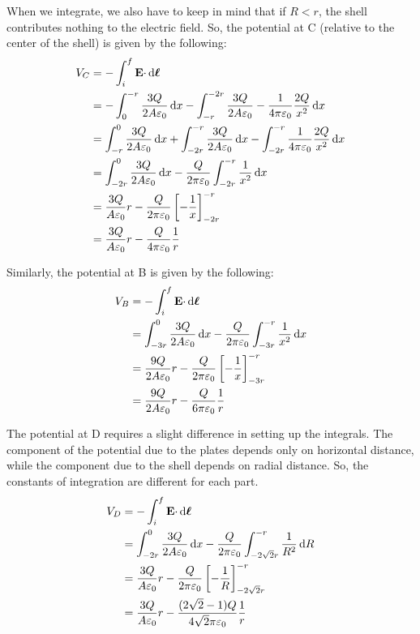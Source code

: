 \documentclass{article}
\begin{document}
When we integrate, we also have to keep in mind that if $R < r$, the shell contributes nothing to the electric field. So, the potential at C (relative to the center of the shell) is given by the following:
\begin{equation*}
\begin{aligned}
V_C &= -\int_i^f \vb{E}\cdotp \dd{\vb*{\ell}} \\
&= -\int_0^{-r} \frac{3Q}{2A\varepsilon_0}\dd{x} - \int_{-r}^{-2r} \frac{3Q}{2A\varepsilon_0} - \frac{1}{4 \pi\varepsilon_0}\frac{2Q}{x^2}\dd{x} \\
&= \int_{-r}^0 \frac{3Q}{2A\varepsilon_0}\dd{x} + \int_{-2r}^{-r} \frac{3Q}{2A\varepsilon_0}\dd{x} - \int_{-2r}^{-r} \frac{1}{4 \pi\varepsilon_0}\frac{2Q}{x^2}\dd{x} \\
&= \int_{-2r}^0 \frac{3Q}{2A\varepsilon_0}\dd{x} - \frac{Q}{2 \pi\varepsilon_0}\int_{-2r}^{-r} \frac{1}{x^2}\dd{x} \\
&= \frac{3Q}{A\varepsilon_0}r - \frac{Q}{2 \pi\varepsilon_0}\left[-\frac{1}{x}\right]_{-2r}^{-r} \\
&= \frac{3Q}{A\varepsilon_0}r - \frac{Q}{4 \pi\varepsilon_0}\frac{1}{r}
\end{aligned}
\end{equation*}

Similarly, the potential at B is given by the following:
\begin{equation*}
\begin{aligned}
V_B &= -\int_i^f \vb{E}\cdotp \dd{\vb*{\ell}} \\
&= \int_{-3r}^0 \frac{3Q}{2A\varepsilon_0}\dd{x} - \frac{Q}{2 \pi\varepsilon_0}\int_{-3r}^{-r} \frac{1}{x^2}\dd{x} \\
&= \frac{9Q}{2A\varepsilon_0}r - \frac{Q}{2 \pi\varepsilon_0}\left[-\frac{1}{x}\right]_{-3r}^{-r} \\
&= \frac{9Q}{2A\varepsilon_0}r - \frac{Q}{6 \pi\varepsilon_0}\frac{1}{r}
\end{aligned}
\end{equation*}

The potential at D requires a slight difference in setting up the integrals. The component of the potential due to the plates depends only on horizontal distance, while the component due to the shell depends on radial distance. So, the constants of integration are different for each part.
\begin{equation*}
\begin{aligned}
V_D &= -\int_i^f \vb{E}\cdotp \dd{\vb*{\ell}} \\
&= \int_{-2r}^0 \frac{3Q}{2A\varepsilon_0}\dd{x} - \frac{Q}{2 \pi\varepsilon_0}\int_{-2\sqrt{2}r}^{-r} \frac{1}{R^2}\dd{R} \\
&= \frac{3Q}{A\varepsilon_0}r - \frac{Q}{2 \pi\varepsilon_0}\left[-\frac{1}{R}\right]_{-2\sqrt{2}r}^{-r} \\
&= \frac{3Q}{A\varepsilon_0}r - \frac{(2\sqrt{2}-1)Q}{4\sqrt{2} \pi\varepsilon_0}\frac{1}{r} \\
\end{aligned}
\end{equation*}
\end{document}
